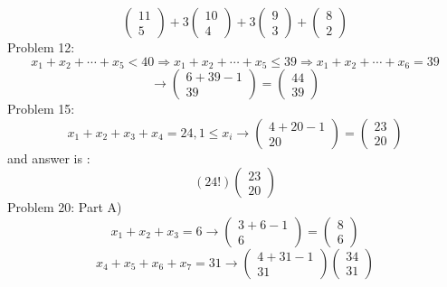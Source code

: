 \documentclass{article}
\begin{document}
	$$
	\left(\begin{array}{c}
	11\\
	5
	\end{array}\right)
	+
	3
	\left(\begin{array}{c}
	10\\
	4
	\end{array}\right)
	+
	3
	\left(\begin{array}{c}
	9\\
	3
	\end{array}\right)
	+
	\left(\begin{array}{c}
	8\\
	2
	\end{array}\right)	
	$$
	Problem 12:
	$$
	x_1+x_2+\cdots+x_5<40 \Rightarrow
	x_1+x_2+\cdots+x_5 \leq 39 \Rightarrow
	x_1+x_2+\cdots+x_6=39 
	$$
	$$	
	\rightarrow
	\left(\begin{array}{c}
	6+39-1\\
	39
	\end{array}\right)
	=
	\left(\begin{array}{c}
	44\\
	39
	\end{array}\right)
	$$
	Problem 15:
	$$
	x_1+x_2+x_3+x_4=24,1 \leq x_i
	\rightarrow
	\left(\begin{array}{c}
	4+20-1\\
	20
	\end{array}\right)
	=
	\left(\begin{array}{c}
	23\\
	20
	\end{array}\right)	
	$$
	and answer is :
	$$
	(24!)
	\left(\begin{array}{c}
	23\\
	20
	\end{array}\right)
	$$
	Problem 20: Part A)
	$$
	x_1+x_2+x_3=6 \rightarrow
	\left(\begin{array}{c}
	3+6-1\\
	6
	\end{array}\right)
	=
	\left(\begin{array}{c}
	8\\
	6
	\end{array}\right)
	$$
	$$
	x_4+x_5+x_6+x_7=31 \rightarrow
	\left(\begin{array}{c}
	4+31-1\\
	31
	\end{array}\right)
	\left(\begin{array}{c}
	34\\
	31
	\end{array}\right)
	$$
\end{document}
